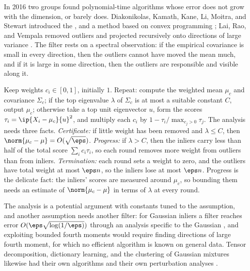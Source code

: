 \begin{refsection}
In 2016 two groups found polynomial-time algorithms whose error does not grow with the dimension, or barely does. Diakonikolas, Kamath, Kane, Li, Moitra, and Stewart introduced the , and a method based on convex programming \parencite{Diakonikolas2016}; Lai, Rao, and Vempala removed outliers and projected recursively onto directions of large variance \parencite{Lai2016}. The filter rests on a spectral observation: if the empirical covariance is small in every direction, then the outliers cannot have moved the mean much, and if it is large in some direction, then the outliers are responsible and visible along it.

\begin{aside}
Keep weights $c_i\in[0,1]$, initially $1$. Repeat: compute the weighted mean $\mu_c$ and covariance $\Sigma_c$; if the top eigenvalue $\lambda$ of $\Sigma_c$ is at most a suitable constant $C$, output $\mu_c$; otherwise take a top unit eigenvector $u$, form the scores $\tau_i=\ip{X_i-\mu_c}{u}^2$, and multiply each $c_i$ by $1-\tau_i/\max_{c_j>0}\tau_j$. The analysis needs three facts. \emph{Certificate:} if little weight has been removed and $\lambda\le C$, then $\norm{\mu_c-\mu}=O(\sqrt\eps)$. \emph{Progress:} if $\lambda>C$, then the inliers carry less than half of the total score $\sum_ic_i\tau_i$, so each round removes more weight from outliers than from inliers. \emph{Termination:} each round sets a weight to zero, and the outliers have total weight at most $\eps n$, so the inliers lose at most $\eps n$. Progress is the delicate fact: the inliers' scores are measured around $\mu_c$, so bounding them needs an estimate of $\norm{\mu_c-\mu}$ in terms of $\lambda$ at every round.
\end{aside}

The analysis is a potential argument with constants tuned to the assumption, and another assumption needs another filter: for Gaussian inliers a filter reaches error $O(\eps\sqrt{\log(1/\eps)})$ through an analysis specific to the Gaussian \parencite{Diakonikolas2016}, and exploiting bounded fourth moments would require finding directions of large fourth moment, for which no efficient algorithm is known on general data. Tensor decomposition, dictionary learning, and the clustering of Gaussian mixtures likewise had their own algorithms and their own perturbation analyses \parencite{BarakKelnerSteurer2015,HopkinsLi2018}.


\end{refsection}
